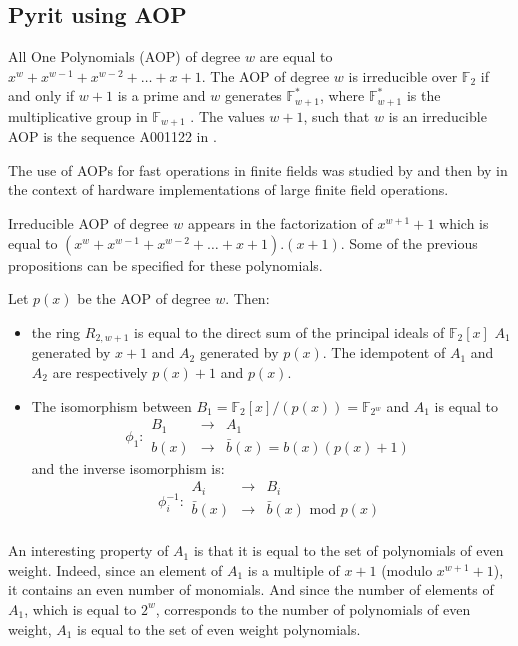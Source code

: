 \documentclass[conference]{IEEEtran}
\begin{document}
\subsection{Pyrit using AOP}
\label{sec:aop}
All One Polynomials (AOP) of degree $w$ are equal to $x^w+x^{w-1}+x^{w-2}+\ldots+x+1$. The AOP of degree $w$ is irreducible over $\mathbb{F}_{2}$  if and only if $w+1$ is a prime and $w$ generates $\mathbb{F}^*_{w+1}$, where $\mathbb{F}^*_{w+1}$ is the multiplicative group in $\mathbb{F}_{w+1}$ \cite{Wah1984}. The values $w+1$, such that $w$ is an irreducible AOP is the sequence A001122 in \cite{A001122}.

The use of AOPs for fast operations in finite fields was studied by \cite{ITOH1989} and then by \cite{Silverman1999} in the context of hardware implementations of large finite field operations. 

Irreducible AOP of degree $w$ appears in the factorization of $x^{w+1}+1$ which is equal to $( x^w+x^{w-1}+x^{w-2}+\ldots+x+1).(x+1)$. Some of the previous propositions can be specified for these polynomials. 

Let $p(x)$ be the AOP of degree $w$. Then:
\begin{itemize}
	\item  the ring $R_{2,w+1}$ is equal to the direct sum of the principal ideals of  $\mathbb{F}_{2}[x]$ $A_1$ generated by $x+1$  and $A_2$ generated by $p(x)$. 
	The idempotent of $A_1$  and $A_2$  are respectively $p(x)+1$ and $p(x)$.
	\item  The isomorphism between $B_1=\mathbb{F}_{2}[x]/(p(x))=\mathbb{F}_{2^w}$ and $A_1$ is equal to 
	\begin{equation}
	\phi_1  :  \begin{array}{ccc}
	B_1 & \rightarrow & A_1 \\
	b(x) & \rightarrow & \bar{b}(x)=b(x)(p(x)+1) \
	\end{array}
	\end{equation}  	
	and the inverse isomorphism is:
	\begin{equation}
	\phi_i^{-1}  :  \begin{array}{ccc}
	A_i & \rightarrow & B_i \\
	\bar{b}(x) & \rightarrow & \bar{b}(x)\textrm{ mod }p(x)\\
	\end{array}
	\end{equation} 
\end{itemize}

An interesting property of $A_1$ is that it is equal to the set of polynomials of even weight. Indeed, since an element of $A_1$ is a multiple of $x+1$ (modulo $x^{w+1}+1$), it contains an even number of monomials. And since the number of elements of $A_1$, which is equal to $2^w$, corresponds to the number of polynomials of even weight, $A_1$ is equal to the set of even weight polynomials.  
\end{document}
